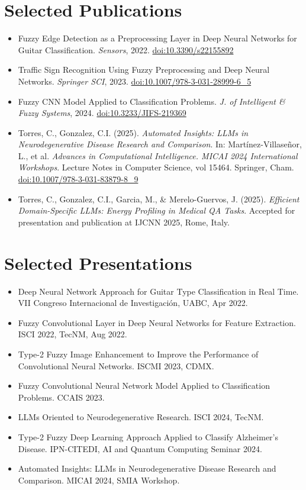 \documentclass[letterpaper,11pt]{article}
\begin{document}
\section*{Selected Publications}
\begin{itemize}[leftmargin=0.15in]
  \item Fuzzy Edge Detection as a Preprocessing Layer in Deep Neural Networks for Guitar Classification. \textit{Sensors}, 2022. \href{https://doi.org/10.3390/s22155892}{doi:10.3390/s22155892}
  \item Traffic Sign Recognition Using Fuzzy Preprocessing and Deep Neural Networks. \textit{Springer SCI}, 2023. \href{https://doi.org/10.1007/978-3-031-28999-6_5}{doi:10.1007/978-3-031-28999-6\_5}
  \item Fuzzy CNN Model Applied to Classification Problems. \textit{J. of Intelligent \& Fuzzy Systems}, 2024. \href{http://doi.org/10.3233/JIFS-219369}{doi:10.3233/JIFS-219369}
  \item Torres, C., Gonzalez, C.I. (2025). \textit{Automated Insights: LLMs in Neurodegenerative Disease Research and Comparison}. In: Martínez-Villaseñor, L., et al. \textit{Advances in Computational Intelligence. MICAI 2024 International Workshops}. Lecture Notes in Computer Science, vol 15464. Springer, Cham. \href{https://doi.org/10.1007/978-3-031-83879-8_9}{doi:10.1007/978-3-031-83879-8\_9}
  \item Torres, C., Gonzalez, C.I., Garcia, M., \& Merelo-Guervos, J. (2025). \textit{Efficient Domain-Specific LLMs: Energy Profiling in Medical QA Tasks}. Accepted for presentation and publication at IJCNN 2025, Rome, Italy.
\end{itemize}

\section*{Selected Presentations}
\begin{itemize}[leftmargin=0.15in]
  \item Deep Neural Network Approach for Guitar Type Classification in Real Time. VII Congreso Internacional de Investigación, UABC, Apr 2022.
  \item Fuzzy Convolutional Layer in Deep Neural Networks for Feature Extraction. ISCI 2022, TecNM, Aug 2022.
  \item Type-2 Fuzzy Image Enhancement to Improve the Performance of Convolutional Neural Networks. ISCMI 2023, CDMX.
  \item Fuzzy Convolutional Neural Network Model Applied to Classification Problems. CCAIS 2023.
  \item LLMs Oriented to Neurodegenerative Research. ISCI 2024, TecNM.
  \item Type-2 Fuzzy Deep Learning Approach Applied to Classify Alzheimer's Disease. IPN-CITEDI, AI and Quantum Computing Seminar 2024.
  \item Automated Insights: LLMs in Neurodegenerative Disease Research and Comparison. MICAI 2024, SMIA Workshop.
\end{itemize}
\end{document}
